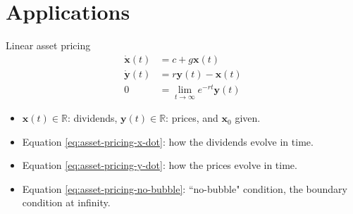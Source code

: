 \documentclass[aspectratio=169,10pt]{beamer}
\begin{document}
\section{Applications}

\begin{frame}{Linear asset pricing}
\begin{align}
	\dot{\mathbf{x}}(t) &= c + g \mathbf{x}(t) \label{eq:asset-pricing-x-dot}\\%
	\dot{\mathbf{y}}(t) &= r \mathbf{y}(t) - \mathbf{x}(t)  \label{eq:asset-pricing-y-dot}\\%
	0 &= \lim_{t\rightarrow \infty} e^{-r t}\mathbf{y}(t) \label{eq:asset-pricing-no-bubble}%
\end{align}

\begin{itemize}
	\item $\mathbf{x}(t)\in \mathbb{R}$: dividends, $\mathbf{y}(t)\in \mathbb{R}$: prices, and $\mathbf{x}_0$ given. 
	\vspace{0.1in}
	\item Equation \cref{eq:asset-pricing-x-dot}: how the dividends evolve in time.
	\vspace{0.1in}
	\item  Equation \cref{eq:asset-pricing-y-dot}: how the prices evolve in time.
	\vspace{0.1in}
	\item Equation \cref{eq:asset-pricing-no-bubble}: ``no-bubble" condition, the boundary condition at infinity. 
	\end{itemize}
\end{frame}
\end{document}
